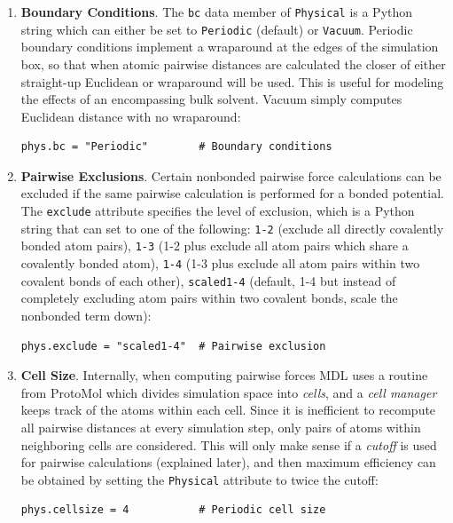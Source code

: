 \documentclass[11pt]{report}
\begin{document}
\begin{enumerate}

\item {\bf Boundary Conditions}.  
The \texttt{bc} data member of \texttt{Physical} is a Python
string which can either be set to \texttt{Periodic} (default)
or \texttt{Vacuum}.  Periodic boundary conditions implement
a wraparound at the edges of the simulation box, so that when
atomic pairwise distances are calculated the closer of either
straight-up Euclidean or wraparound will be used.  This is
useful for modeling the effects of an encompassing bulk solvent.
Vacuum simply computes Euclidean distance with no wraparound:

\begin{verbatim}
phys.bc = "Periodic"        # Boundary conditions
\end{verbatim}

\item {\bf Pairwise Exclusions}.  
Certain nonbonded pairwise force calculations can be excluded if
the same pairwise calculation is performed for a bonded potential.
The \texttt{exclude} attribute specifies the level of exclusion,
which is a Python string that can set to one of the following:
\texttt{1-2} (exclude all directly covalently bonded atom pairs),
\texttt{1-3} (1-2 plus exclude all atom pairs which share a covalently
bonded atom), \texttt{1-4} (1-3 plus exclude all atom pairs within
two covalent bonds of each other), \texttt{scaled1-4} (default, 1-4 but instead
of completely excluding atom pairs within two covalent bonds, scale
the nonbonded term down):

\begin{verbatim}
phys.exclude = "scaled1-4"  # Pairwise exclusion
\end{verbatim}

\item {\bf Cell Size}.
Internally, when computing pairwise forces MDL uses a routine
from ProtoMol which divides simulation space into {\it cells},
and a {\it cell manager} keeps track of the atoms within each
cell.  Since it is inefficient to recompute all pairwise distances
at every simulation step, only pairs of atoms within neighboring
cells are considered.  This will only make sense if a {\it cutoff}
is used for pairwise calculations (explained later), and then 
maximum efficiency can be obtained by setting the \texttt{Physical} 
attribute to twice the cutoff:

\begin{verbatim}
phys.cellsize = 4           # Periodic cell size
\end{verbatim}


\end{enumerate}
\end{document}
